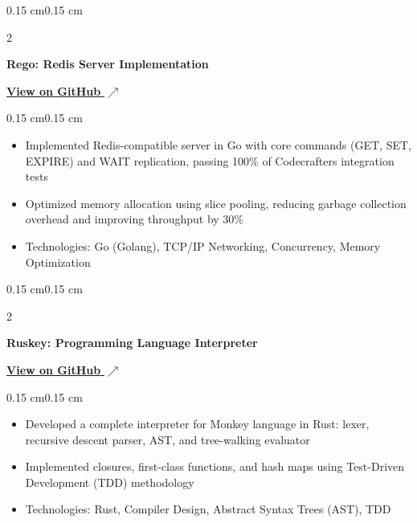 \documentclass[10pt, letterpaper]{article}
\newcommand{\githublink}[2]{\href{#1}{#2 $\nearrow$}}
\newenvironment{highlights}{
    \begin{itemize}[
        topsep=0.08 cm,
        parsep=0.05 cm,
        partopsep=0pt,
        itemsep=0pt,
        leftmargin=0.4 cm
    ]
}{
    \end{itemize}
}
\newenvironment{onecolentry}{
    \begin{adjustwidth}{0.15 cm}{0.15 cm}
}{
    \end{adjustwidth}
}
\newenvironment{twocolentry}[2][]{
    \onecolentry
    \def\secondColumn{#2}
    \setcolumnwidth{\fill, 4.5 cm}
    \begin{paracol}{2}
}{
    \switchcolumn \raggedleft \secondColumn
    \end{paracol}
    \endonecolentry
}
\begin{document}
        \vspace{0.15 cm}
    
        \begin{twocolentry}{
            \githublink{https://github.com/yuann3/Rego/}{\textbf{View on GitHub}}
        }
            \textbf{Rego: Redis Server Implementation}
        \end{twocolentry}
        \vspace{0.08 cm}
        \begin{onecolentry}
            \begin{highlights}
                \item Implemented Redis-compatible server in Go with core commands (GET, SET, EXPIRE) and WAIT replication, passing 100\% of Codecrafters integration tests
                \item Optimized memory allocation using slice pooling, reducing garbage collection overhead and improving throughput by 30\%
                \item Technologies: Go (Golang), TCP/IP Networking, Concurrency, Memory Optimization
            \end{highlights}
        \end{onecolentry}

        \vspace{0.15 cm}
    
        \begin{twocolentry}{
            \githublink{https://github.com/yuann3/Ruskey/}{\textbf{View on GitHub}}
        }
            \textbf{Ruskey: Programming Language Interpreter}
        \end{twocolentry}
        \vspace{0.08 cm}
        \begin{onecolentry}
            \begin{highlights}
                \item Developed a complete interpreter for Monkey language in Rust: lexer, recursive descent parser, AST, and tree-walking evaluator
                \item Implemented closures, first-class functions, and hash maps using Test-Driven Development (TDD) methodology
                \item Technologies: Rust, Compiler Design, Abstract Syntax Trees (AST), TDD
            \end{highlights}
        \end{onecolentry}

        \vspace{0.15 cm}
\end{document}
